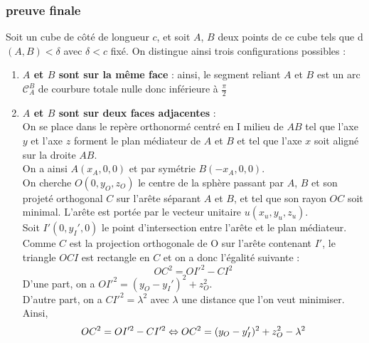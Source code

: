 \documentclass{article}
\begin{document}
\subsubsection{preuve finale}

Soit un cube de côté de longueur $c$, et soit $A$, $B$ deux points de ce cube tels que d$(A, B) < \delta$ avec $\delta < c$ fixé.
On distingue ainsi trois configurations possibles :
\begin{enumerate}
    \item \textbf{$A$ et $B$ sont sur la même face} : ainsi, le segment reliant $A$ et $B$ est un arc $\mathcal{C}_A^B$ de courbure totale nulle donc inférieure à $\frac{\pi}{2}$
    
    \item \textbf{$A$ et $B$ sont sur deux faces adjacentes} : \\
    On se place dans le repère orthonormé centré en I milieu de $AB$ tel que l'axe $y$ et l'axe $z$ forment le plan médiateur de $A$ et $B$ et tel que l'axe $x$ soit aligné sur la droite $AB$.\\
    On a ainsi $A(x_A, 0, 0)$ et par symétrie $B(-x_A, 0, 0)$.\\
    On cherche $O(0, y_O, z_O)$ le centre de la sphère passant par $A$, $B$ et son projeté orthogonal $C$ sur l'arête séparant $A$ et $B$, et tel que son rayon $OC$ soit minimal. L'arête est portée par le vecteur unitaire $u(x_u, y_u, z_u)$.\\
    Soit $I'(0, y_I', 0)$ le point d'intersection entre l'arête et le plan médiateur. Comme $C$ est la projection orthogonale de O sur l'arête contenant $I'$, le triangle $OCI$ est rectangle en $C$ et on a donc l'égalité suivante :
    $$OC^2 = OI'^2 - CI^2$$
    D'une part, on a $OI'^2 = (y_O - y_I')^2 + z_O^2$.\\
    D'autre part, on a $CI'^2 = \lambda^2$ avec $\lambda$ une distance que l'on veut minimiser.\\
    Ainsi, 
    \begin{equation}\label{eq:pythagoras}
        OC^2 = OI'^2 - CI'^2 \Leftrightarrow OC^2 = (y_O - y_I')^2 + z_O^2 - \lambda^2\\
    \end{equation}
    

\end{enumerate}
\end{document}
